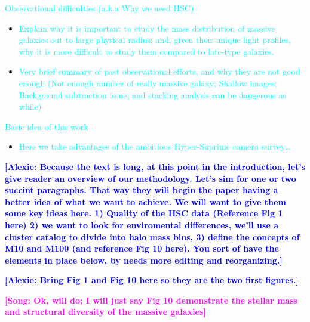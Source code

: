 \documentclass{emulateapj}
\newcommand{\plan}[1]{\textcolor{cyan}{#1}}
\newcommand{\song}[1]{\textcolor{magenta}{\textbf{[Song: #1]}}}
\newcommand{\alexie}[1]{\textcolor{blue}{\textbf{[Alexie: #1]}}}
\begin{document}
\begin{CJK*}{UTF8}{gbsn}
    \plan{Observational difficulties (a.k.a Why we need HSC)}
    \begin{itemize}
        \item \plan{Explain why it is important to study the mass distribution of 
            massive galaxies out to large physical radius; and, given their unique light 
            profiles, why it is more difficult to study them compared to late-type 
            galaxies.}
        \item \plan{Very brief summary of past observational efforts, and why they are not 
            good enough (Not enough number of really massive galaxy; Shallow images; 
            Background subtraction issue; and stacking analysis can be dangerous as while)}
    \end{itemize}
    
    \plan{Basic idea of this work}
    \begin{itemize}
        \item \plan{Here we take advantages of the ambitious Hyper-Suprime camera 
            survey\ldots}
    \end{itemize}

\alexie{Because the text is long, at this point in the introduction, let's give reader an overview of our methodology. Let's sim for one or two succint paragraphs. That way they will begin the paper having a better idea of what we want to achieve. We will want to give them some key ideas here. 1) Quality of the HSC data (Reference Fig 1 here) 2) we want to look for enviromental differences, we'll use  a cluster catalog to divide into halo mass bins, 3) define the concepts of M10 and M100 (and reference Fig 10 here). You sort of have the elements in place below, by needs more editing and reorganizing.}

\alexie{Bring Fig 1 and Fig 10 here so they are the two first figures.}

	\song{Ok, will do; I will just say Fig 10 demonstrate the stellar mass and structural 
    	diversity of the massive galaxies}


\end{CJK*}
\end{document}
